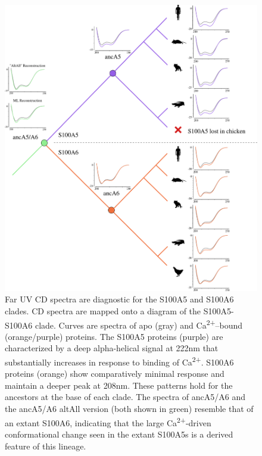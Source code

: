 \begin{figure}
\centering
	\includegraphics{ch5-figS3.png} 
\caption[Far UV CD spectra are diagnostic for S100A5 and
S100A6]{Far UV CD spectra are diagnostic for the S100A5 and
S100A6 clades. CD spectra are mapped onto a diagram of the S100A5-S100A6
clade. Curves are spectra of apo (gray) and Ca\textsuperscript{2+}–bound
(orange/purple) proteins. The S100A5 proteins (purple) are characterized
by a deep alpha-helical signal at 222nm that substantially increases
in response to binding of Ca\textsuperscript{2+}. S100A6 proteins
(orange) show comparatively minimal response and maintain a deeper
peak at 208nm. These patterns hold for the ancestors at the base of
each clade. The spectra of ancA5/A6 and the ancA5/A6 altAll version
(both shown in green) resemble that of an extant S100A6, indicating
that the large Ca\textsuperscript{2+}-driven conformational change
seen in the extant S100A5s is a derived feature of this lineage. \label{samplefigure}}	
\end{figure}



